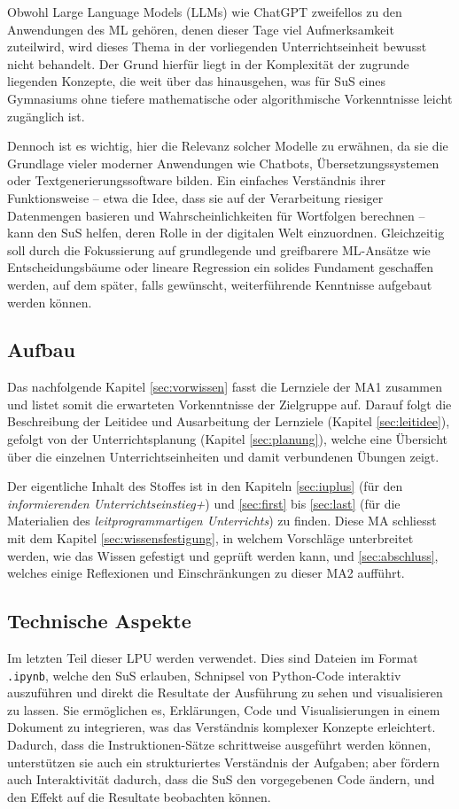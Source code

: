 \documentclass[twocolumn]{article}
\begin{document}
Obwohl Large Language Models (LLMs) wie ChatGPT zweifellos zu den Anwendungen des ML gehören, denen dieser Tage viel Aufmerksamkeit zuteilwird, wird dieses Thema in der vorliegenden Unterrichtseinheit bewusst nicht behandelt. Der Grund hierfür liegt in der Komplexität der zugrunde liegenden Konzepte, die weit über das hinausgehen, was für SuS eines Gymnasiums ohne tiefere mathematische oder algorithmische Vorkenntnisse leicht zugänglich ist.

Dennoch ist es wichtig, hier die Relevanz solcher Modelle zu erwähnen, da sie die Grundlage vieler moderner Anwendungen wie Chatbots, Übersetzungssystemen oder Textgenerierungssoftware bilden. Ein einfaches Verständnis ihrer Funktionsweise – etwa die Idee, dass sie auf der Verarbeitung riesiger Datenmengen basieren und Wahrscheinlichkeiten für Wortfolgen berechnen – kann den SuS helfen, deren Rolle in der digitalen Welt einzuordnen. Gleichzeitig soll durch die Fokussierung auf grundlegende und greifbarere ML-Ansätze wie Entscheidungsbäume oder lineare Regression ein solides Fundament geschaffen werden, auf dem später, falls gewünscht, weiterführende Kenntnisse aufgebaut werden können.

\subsection{Aufbau}
Das nachfolgende Kapitel \ref{sec:vorwissen} fasst die Lernziele der MA1 zusammen und listet somit die erwarteten Vorkenntnisse der Zielgruppe auf. Darauf folgt die Beschreibung der Leitidee und Ausarbeitung der Lernziele (Kapitel \ref{sec:leitidee}), gefolgt von der Unterrichtsplanung (Kapitel \ref{sec:planung}), welche eine Übersicht über die einzelnen Unterrichtseinheiten und damit verbundenen Übungen zeigt.

Der eigentliche Inhalt des Stoffes ist in den Kapiteln \ref{sec:iuplus} (für den \textit{informierenden Unterrichtseinstieg+}) und \ref{sec:first} bis \ref{sec:last} (für die Materialien des \textit{leitprogrammartigen Unterrichts}) zu finden. Diese MA schliesst mit dem Kapitel \ref{sec:wissensfestigung}, in welchem Vorschläge unterbreitet werden, wie das Wissen gefestigt und geprüft werden kann, und \ref{sec:abschluss}, welches einige Reflexionen und Einschränkungen zu dieser MA2 aufführt.

\subsection{Technische Aspekte}
Im letzten Teil dieser LPU werden  verwendet. Dies sind Dateien im Format \texttt{.ipynb}, welche den SuS erlauben, Schnipsel von Python-Code interaktiv auszuführen und direkt die Resultate der Ausführung zu sehen und visualisieren zu lassen. Sie ermöglichen es, Erklärungen, Code und Visualisierungen in einem Dokument zu integrieren, was das Verständnis komplexer Konzepte erleichtert. Dadurch, dass die Instruktionen-Sätze schrittweise ausgeführt werden können, unterstützen sie auch ein strukturiertes Verständnis der Aufgaben; aber fördern auch Interaktivität dadurch, dass die SuS den vorgegebenen Code ändern, und den Effekt auf die Resultate beobachten können.
\end{document}
